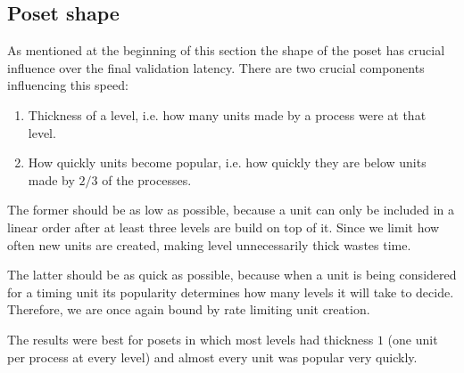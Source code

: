 \documentclass[a4paper,10pt]{article}
\begin{document}
		\subsection{Poset shape}
		 \label{ssec:posetShape}
			As mentioned at the beginning of this section the shape of the poset has crucial influence over the final validation latency.
			There are two crucial components influencing this speed:
			\begin{enumerate}
				\item Thickness of a level, i.e. how many units made by a process were at that level.
				\item How quickly units become popular, i.e. how quickly they are below units made by $2/3$ of the processes.
			\end{enumerate}
			The former should be as low as possible, because a unit can only be included in a linear order after at least three levels are build on top of it.
			Since we limit how often new units are created, making level unnecessarily thick wastes time.

			The latter should be as quick as possible, because when a unit is being considered for a timing unit its popularity determines how many levels it will take to decide.
		 Therefore, we are once again bound by rate limiting unit creation.

			The results were best for posets in which most levels had thickness $1$ (one unit per process at every level) and almost every unit was popular very quickly.
\end{document}
